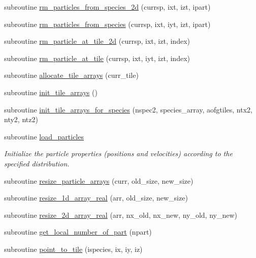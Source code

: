 \begin{DoxyCompactItemize}
\item 
subroutine \hyperlink{namespacetiling_a837e4ff4ce81c945e94ea975a1df6fc1}{rm\+\_\+particles\+\_\+from\+\_\+species\+\_\+2d} (currsp, ixt, izt, ipart)
\item 
subroutine \hyperlink{namespacetiling_a473875b1f5e9bc6b47ff5d088db15e58}{rm\+\_\+particles\+\_\+from\+\_\+species} (currsp, ixt, iyt, izt, ipart)
\item 
subroutine \hyperlink{namespacetiling_ad6083dac6e2eaccb762ecb829c954898}{rm\+\_\+particle\+\_\+at\+\_\+tile\+\_\+2d} (currsp, ixt, izt, index)
\item 
subroutine \hyperlink{namespacetiling_a7657907098a724d053d587ca73725958}{rm\+\_\+particle\+\_\+at\+\_\+tile} (currsp, ixt, iyt, izt, index)
\item 
subroutine \hyperlink{namespacetiling_aacbab18e61ac532ba396b41bab67a265}{allocate\+\_\+tile\+\_\+arrays} (curr\+\_\+tile)
\item 
subroutine \hyperlink{namespacetiling_a97b828159c1e05df8082c27f3aa61e13}{init\+\_\+tile\+\_\+arrays} ()
\item 
subroutine \hyperlink{namespacetiling_afe5a0a0a27fa1c078f8e69228d0d4a56}{init\+\_\+tile\+\_\+arrays\+\_\+for\+\_\+species} (nspec2, species\+\_\+array, aofgtiles, ntx2, nty2, ntz2)
\item 
subroutine \hyperlink{namespacetiling_ae5c4e98ae7e7957054dda03ab0e298f8}{load\+\_\+particles}
\begin{DoxyCompactList}\small\item\em Initialize the particle properties (positions and velocities) according to the specified distribution. \end{DoxyCompactList}\item 
subroutine \hyperlink{namespacetiling_aaa407b13d58fff3e54b191fa9a8962c0}{resize\+\_\+particle\+\_\+arrays} (curr, old\+\_\+size, new\+\_\+size)
\item 
subroutine \hyperlink{namespacetiling_ad65e35a84d2268ef2b6b4f97f38b18bc}{resize\+\_\+1d\+\_\+array\+\_\+real} (arr, old\+\_\+size, new\+\_\+size)
\item 
subroutine \hyperlink{namespacetiling_afa3d754a121460dce786357819629421}{resize\+\_\+2d\+\_\+array\+\_\+real} (arr, nx\+\_\+old, nx\+\_\+new, ny\+\_\+old, ny\+\_\+new)
\item 
subroutine \hyperlink{namespacetiling_af9f6fdf5c755688f10dc74ed3c363d85}{get\+\_\+local\+\_\+number\+\_\+of\+\_\+part} (npart)
\item 
subroutine \hyperlink{namespacetiling_a875e1671637fb100355fe099ef2a4f63}{point\+\_\+to\+\_\+tile} (ispecies, ix, iy, iz)

\end{DoxyCompactItemize}

